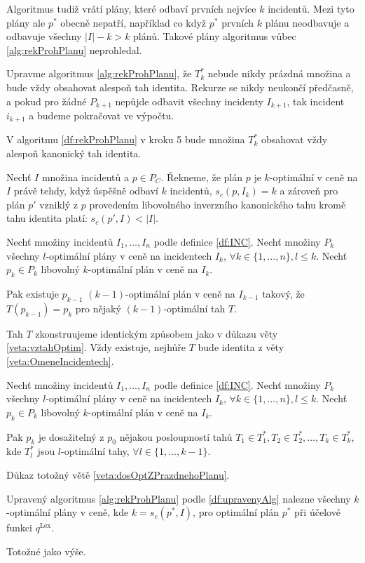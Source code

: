Algoritmus tudiž vrátí plány, které odbaví prvních nejvíce $k$ incidentů.
Mezi tyto plány ale $p^*$ obecně nepatří, například co když $p^*$ prvních $k$ plánu neodbavuje a odbavuje všechny $|I| - k > k$ plánů. 
Takové plány algoritmus vůbec \ref{alg:rekProhPlanu} neprohledal.

Upravme algoritmus \ref{alg:rekProhPlanu}, že $T^*_k$ nebude nikdy prázdná množina a bude vždy obsahovat alespoň tah identita. 
Rekurze se nikdy neukončí předčasně, a pokud pro žádné $P_{k+1}$ nepůjde odbavit všechny incidenty $I_{k+1}$, tak incident $i_{k+1}$  a budeme pokračovat ve výpočtu.

\begin{definice}\label{df:upravenyAlg}
  V algoritmu \ref{df:rekProhPlanu} v kroku 5 bude množina $T^*_k$ obsahovat vždy alespoň kanonický tah identita.
\end{definice}

\begin{definice}
  Nechť $I$ množina incidentů a $p \in P_C$.
  Řekneme, že plán $p$ je $k$-optimální v ceně na $I$ právě tehdy, když úspěšně odbaví $k$ incidentů, $s_c(p, I_k) = k$ a zároveň
  pro plán $p'$ vzniklý z $p$ provedením libovolného inverzního kanonického tahu kromě tahu identita platí: $s_c(p', I) < |I|$.
\end{definice}

\begin{veta}
  Nechť množiny incidentů $I_1, \dots, I_n$ podle definice \ref{df:INC}.
  Nechť množiny $P_{k}$ všechny $l$-optimální plány v ceně na incidentech $I_k$, $\forall k \in \{ 1, \dots, n \}, l \leq k$.
  Nechť $p_k \in P_k$ libovolný $k$-optimální plán v ceně na $I_k$.

  Pak existuje $p_{k-1}$ $(k-1)$-optimální plán v ceně na $I_{k-1}$ takový, že $T(p_{k-1}) = p_k$ pro nějaký $(k-1)$-optimální tah $T$. 
\end{veta}
\begin{dukaz}
  Tah $T$ zkonstruujeme identickým způsobem jako v důkazu věty \ref{veta:vztahOptim}. Vždy existuje, nejhůře $T$ bude identita z věty \ref{veta:OmeneIncidentech}.
\end{dukaz}

\begin{veta}\label{veta:dosOptZPrazdnehoPlanu}
  Nechť množiny incidentů $I_1, \dots, I_n$ podle definice \ref{df:INC}.
  Nechť množiny $P_{k}$ všechny $l$-optimální plány v ceně na incidentech $I_k$, $\forall k \in \{ 1, \dots, n \}, l \leq k$.
  Nechť $p_k \in P_k$ libovolný $k$-optimální plán v ceně na $I_k$.

  Pak $p_k$ je dosažitelný z $p_0$ nějakou posloupností tahů $T_1 \in T^*_1, T_2 \in T^*_2, \dots, T_k \in T^*_k$, kde $T^*_l$ jsou $l$-optimální tahy, $\forall l \in \{ 1, \dots, k-1 \}$.
\end{veta}
\begin{dukaz}
  Důkaz totožný větě \ref{veta:dosOptZPrazdnehoPlanu}.
\end{dukaz}

\begin{veta}
  Upravený algoritmus \ref{alg:rekProhPlanu} podle \ref{df:upravenyAlg} nalezne všechny $k$-optimální plány v ceně, kde $k = s_c(p^*, I)$,
  pro optimální plán $p^*$ při účelové funkci $q^{\text{Lex}}$.
\end{veta}
\begin{dukaz}
  Totožné jako výše.
\end{dukaz}

